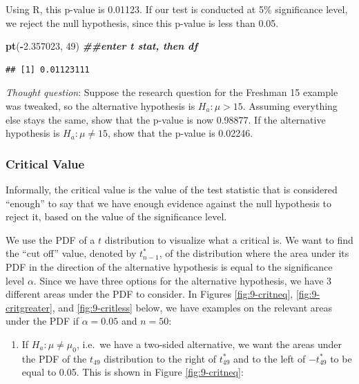 \documentclass[
]{book}
\newenvironment{Shaded}{\begin{snugshade}}{\end{snugshade}}
\newcommand{\DecValTok}[1]{\textcolor[rgb]{0.00,0.00,0.81}{#1}}
\newcommand{\DocumentationTok}[1]{\textcolor[rgb]{0.56,0.35,0.01}{\textbf{\textit{#1}}}}
\newcommand{\FloatTok}[1]{\textcolor[rgb]{0.00,0.00,0.81}{#1}}
\newcommand{\FunctionTok}[1]{\textcolor[rgb]{0.13,0.29,0.53}{\textbf{#1}}}
\newcommand{\NormalTok}[1]{#1}
\newcommand{\SpecialCharTok}[1]{\textcolor[rgb]{0.81,0.36,0.00}{\textbf{#1}}}
\providecommand{\tightlist}{%
  \setlength{\itemsep}{0pt}\setlength{\parskip}{0pt}}
\begin{document}
Using R, this p-value is 0.01123. If our test is conducted at 5\% significance level, we reject the null hypothesis, since this p-value is less than 0.05.

\begin{Shaded}
\begin{Highlighting}[]
\FunctionTok{pt}\NormalTok{(}\SpecialCharTok{{-}}\FloatTok{2.357023}\NormalTok{, }\DecValTok{49}\NormalTok{) }\DocumentationTok{\#\#enter t stat, then df}
\end{Highlighting}
\end{Shaded}

\begin{verbatim}
## [1] 0.01123111
\end{verbatim}

\emph{Thought question}: Suppose the research question for the Freshman 15 example was tweaked, so the alternative hypothesis is \(H_a:\mu > 15\). Assuming everything else stays the same, show that the p-value is now 0.98877. If the alternative hypothesis is \(H_a: \mu \neq 15\), show that the p-value is 0.02246.

\subsubsection{Critical Value}\label{critical-value-1}

Informally, the critical value is the value of the test statistic that is considered ``enough'' to say that we have enough evidence against the null hypothesis to reject it, based on the value of the significance level.

We use the PDF of a \(t\) distribution to visualize what a critical is. We want to find the ``cut off'' value, denoted by \(t_{n-1}^*\), of the distribution where the area under its PDF in the direction of the alternative hypothesis is equal to the significance level \(\alpha\). Since we have three options for the alternative hypothesis, we have 3 different areas under the PDF to consider. In Figures \ref{fig:9-critneq}, \ref{fig:9-critgreater}, and \ref{fig:9-critless} below, we have examples on the relevant areas under the PDF if \(\alpha=0.05\) and \(n=50\):

\begin{enumerate}
\def\labelenumi{\arabic{enumi}.}
\tightlist
\item
  If \(H_a: \mu \neq \mu_0\), i.e.~we have a two-sided alternative, we want the areas under the PDF of the \(t_{49}\) distribution to the right of \(t_{49}^*\) and to the left of \(-t_{49}^*\) to be equal to 0.05. This is shown in Figure \ref{fig:9-critneq}:
\end{enumerate}
\end{document}

